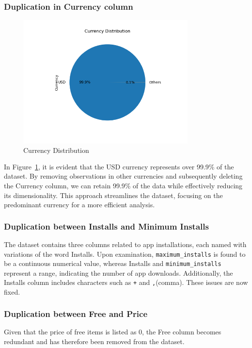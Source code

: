 \subsubsection{Duplication in Currency column}

\begin{figure}[h]
    \centering
    \includegraphics[width=0.8\textwidth]{docs//assets/currency.png}
    \caption{Currency Distribution}
    \label{fig:currency}
\end{figure}

In Figure~\ref{fig:currency}, it is evident that the USD currency represents over 99.9\% of the dataset. By removing observations in other currencies and subsequently deleting the Currency column, we can retain 99.9\% of the data while effectively reducing its dimensionality. This approach streamlines the dataset, focusing on the predominant currency for a more efficient analysis.

\subsubsection{Duplication between Installs and Minimum Installs}
The dataset contains three columns related to app installations, each named with variations of the word Installs. Upon examination, \texttt{maximum\_installs} is found to be a continuous numerical value, whereas Installs and \texttt{minimum\_installs} represent a range, indicating the number of app downloads. Additionally, the Installs column includes characters such as \texttt{+} and \texttt{,}(comma). These issues are now fixed.

\subsubsection{Duplication between Free and Price}
Given that the price of free items is listed as 0, the Free column becomes redundant and has therefore been removed from the dataset.

